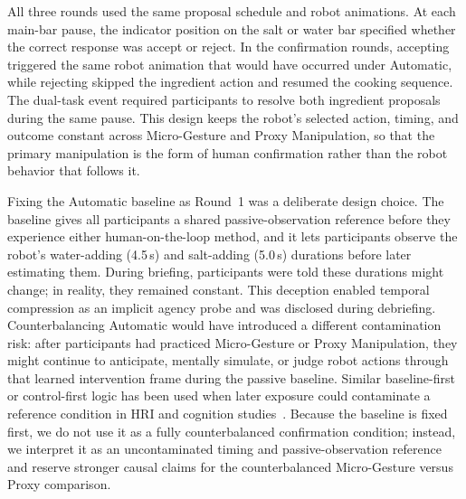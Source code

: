\documentclass[sigconf,review,anonymous]{acmart}
\begin{document}
All three rounds used the same proposal schedule and robot animations. At each main-bar pause, the indicator position on the salt or water bar specified whether the correct response was accept or reject. In the confirmation rounds, accepting triggered the same robot animation that would have occurred under Automatic, while rejecting skipped the ingredient action and resumed the cooking sequence. The dual-task event required participants to resolve both ingredient proposals during the same pause. This design keeps the robot's selected action, timing, and outcome constant across Micro-Gesture and Proxy Manipulation, so that the primary manipulation is the form of human confirmation rather than the robot behavior that follows it.

Fixing the Automatic baseline as Round~1 was a deliberate design choice. The baseline gives all participants a shared passive-observation reference before they experience either human-on-the-loop method, and it lets participants observe the robot's water-adding (4.5\,s) and salt-adding (5.0\,s) durations before later estimating them. During briefing, participants were told these durations might change; in reality, they remained constant. This deception enabled temporal compression as an implicit agency probe and was disclosed during debriefing. Counterbalancing Automatic would have introduced a different contamination risk: after participants had practiced Micro-Gesture or Proxy Manipulation, they might continue to anticipate, mentally simulate, or judge robot actions through that learned intervention frame during the passive baseline. Similar baseline-first or control-first logic has been used when later exposure could contaminate a reference condition in HRI and cognition studies~\cite{wang2018mindperception, cuijpers2015motions, kosslyn1999area17}. Because the baseline is fixed first, we do not use it as a fully counterbalanced confirmation condition; instead, we interpret it as an uncontaminated timing and passive-observation reference and reserve stronger causal claims for the counterbalanced Micro-Gesture versus Proxy comparison.
\end{document}
